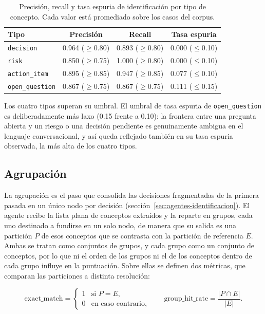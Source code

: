 \begin{table}[H]
  \centering
  \begin{tabular}{lccc}
    \toprule
    \textbf{Tipo} & \textbf{Precisión} & \textbf{Recall} & \textbf{Tasa espuria} \\
    \midrule
    \texttt{decision}      & 0.964 ($\geq$0.80) & 0.893 ($\geq$0.80) & 0.000 ($\leq$0.10) \\
    \texttt{risk}          & 0.850 ($\geq$0.75) & 1.000 ($\geq$0.80) & 0.000 ($\leq$0.10) \\
    \texttt{action\_item}  & 0.895 ($\geq$0.85) & 0.947 ($\geq$0.85) & 0.077 ($\leq$0.10) \\
    \texttt{open\_question}& 0.867 ($\geq$0.75) & 0.867 ($\geq$0.75) & 0.111 ($\leq$0.15) \\
    \bottomrule
  \end{tabular}
  \caption{Precisión, recall y tasa espuria de identificación por tipo de concepto. Cada valor
           está promediado sobre los casos del corpus.}
  \label{tab:eval-identification}
\end{table}

Los cuatro tipos superan su umbral. El umbral de tasa espuria de \texttt{open\_question} es
deliberadamente más laxo (0.15 frente a 0.10): la frontera entre una pregunta abierta y un
riesgo o una decisión pendiente es genuinamente ambigua en el lenguaje conversacional, y así
queda reflejado también en su tasa espuria observada, la más alta de los cuatro tipos.

\subsection{Agrupación}

La agrupación es el paso que consolida las decisiones fragmentadas de la primera pasada en un
único nodo por decisión (sección~\ref{sec:agentes-identificacion}). El agente recibe la lista
plana de conceptos extraídos y la reparte en grupos, cada uno destinado a fundirse en un solo
nodo, de manera que su salida es una partición $P$ de esos conceptos que se contrasta con la
partición de referencia $E$. Ambas se tratan como conjuntos de grupos, y cada grupo como un
conjunto de conceptos, por lo que ni el orden de los grupos ni el de los conceptos dentro de
cada grupo influye en la puntuación. Sobre ellas se definen dos métricas, que comparan las
particiones a distinta resolución:

\begin{equation}
  \text{exact\_match} =
  \begin{cases}
    1 & \text{si } P = E, \\
    0 & \text{en caso contrario,}
  \end{cases}
  \qquad
  \text{group\_hit\_rate} = \frac{\lvert P \cap E \rvert}{\lvert E \rvert}.
\end{equation}

